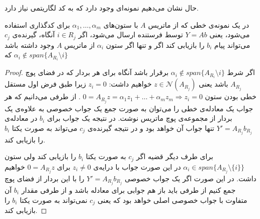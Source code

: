 حال نشان می‌دهیم نمونه‌ای وجود دارد که به کد لگاریتمی نیاز دارد.
\begin{lemma}
	\label{lemma:algebraicconstraint}
	در یک نمونه‌ی
	\picod
	خطی که از ماتریس
	$A$
	با ستون‌های 
	$\alpha_1, \ldots, \alpha_m$
	برای کدگذاری استفاده می‌شود، یعنی
	$Y = A b$
	توسط فرستنده ارسال می‌شود، اگر
	$i \in R_j$
	آنگاه، گیرنده‌‌ی 
	$c_j$
	می‌تواند پیام 
	$b_i$
	را بازیابی کند اگر و تنها اگر ستون
	$\alpha_i$
	از ماتریس
	$A$
	وجود داشته باشد که
	$\alpha_i \notin span\{A_{R_i} \setminus i\}$
\end{lemma}
\begin{proof}
	اگر شرط
	$\alpha_i \notin span\{A_{R_i} \setminus i\}$
	برقرار باشد آنگاه برای هر بردار که در فضای پوچ
	$A_{R_j}$
	باشد یعنی
	$z \in \mathcal{N}(A_{R_j})$
	خواهیم داشت:
	$z_i = 0$
	زیرا طبق فرض اول مستقل خطی بودن ستون
	$0 = A_{R_j} z  = \alpha_1 z_1 + \ldots + \alpha_m z_m \Rightarrow z_i = 0$
	.  از طرفی می‌دانیم که هر جواب یک معادله‌ی خطی را می‌توان به صورت جمع یک جواب خصوصی به علاوه‌ی یک بردار از مجموعه‌ی پوچ ماتریس نوشت. در نتیجه یک جواب برای 
	$b_i$
	در معادله‌ی
	$Y' = A_{R_j} b_{R_j}$
	تنها جواب آن خواهد بود و در نتیجه گیرنده‌ی
	$c_j$
	می‌تواند به صورت یکتا
	$b_i$
	را بازیابی کند.
	
	برای طرف دیگر قضیه اگر 
	$c_j$
	به صورت یکتا
	$b_i$
	را بازیابی کند ولی ستون
	$\alpha_i \in span\{A_{R_j} \setminus \{i\}\}$
	در این صورت جواب با درایه‌ی
	$z_i \neq 0$
	برای
	$0 = A_{R_j} z$
	خواهیم داشت. در این صورت اگر یک جواب خصوصی
	$Y' = A_{R_j} b_{R_j}$
	را با این بردار از فضای پوچ جمع کنیم از طرفی باید باز هم جوابی برای معادله باشد و از طرفی مقدار
	$b_i$
	آن متفاوت با جواب خصوصی اصلی خواهد بود که یعنی 
	$c_j$
	نمی‌تواند به صورت یکتا
	$b_i$
	را بازیابی کند.	
\end{proof}

